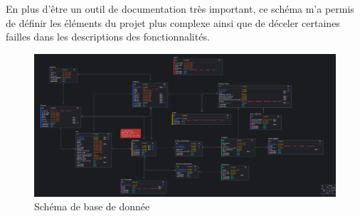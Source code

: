 En plus d'être un outil de documentation très important, ce schéma m'a permis de définir les éléments du projet plus complexe ainsi que de déceler certaines failles dans les descriptions des fonctionnalités. 

\begin{figure}
  \centering
  \includegraphics[width=\textwidth]{img/DB-schema.png}
  \caption{Schéma de base de donnée}
\end{figure}